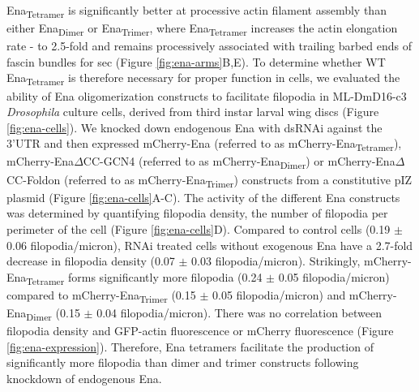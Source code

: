 Ena\textsubscript{Tetramer} is significantly better at processive actin filament assembly than either Ena\textsubscript{Dimer} or Ena\textsubscript{Trimer}, where Ena\textsubscript{Tetramer} increases the actin elongation rate - to 2.5-fold and remains processively associated with trailing barbed ends of fascin bundles for  sec (Figure \ref{fig:ena-arms}B,E). To determine whether WT Ena\textsubscript{Tetramer} is therefore necessary for proper function in cells, we evaluated the ability of Ena oligomerization constructs to facilitate filopodia in ML-DmD16-c3 \textit{Drosophila} culture cells, derived from third instar larval wing discs (Figure \ref{fig:ena-cells}). We knocked down endogenous Ena with dsRNAi against the 3'UTR and then expressed mCherry-Ena (referred to as mCherry-Ena\textsubscript{Tetramer}), mCherry-Ena$\Delta$CC-GCN4 (referred to as mCherry-Ena\textsubscript{Dimer}) or mCherry-Ena$\Delta$CC-Foldon (referred to as mCherry-Ena\textsubscript{Trimer}) constructs from a constitutive pIZ plasmid (Figure \ref{fig:ena-cells}A-C). The activity of the different Ena constructs was determined by quantifying filopodia density, the number of filopodia per perimeter of the cell (Figure \ref{fig:ena-cells}D). Compared to control cells (0.19 $\pm$ 0.06 filopodia/micron), RNAi treated cells without exogenous Ena have a 2.7-fold decrease in filopodia density (0.07 $\pm$ 0.03 filopodia/micron). Strikingly, mCherry-Ena\textsubscript{Tetramer} forms significantly more filopodia (0.24 $\pm$ 0.05 filopodia/micron) compared to mCherry-Ena\textsubscript{Trimer} (0.15 $\pm$ 0.05 filopodia/micron) and mCherry-Ena\textsubscript{Dimer} (0.15 $\pm$ 0.04 filopodia/micron). There was no correlation between filopodia density and GFP-actin fluorescence or mCherry fluorescence (Figure \ref{fig:ena-expression}). Therefore, Ena tetramers facilitate the production of significantly more filopodia than dimer and trimer constructs following knockdown of endogenous Ena.

